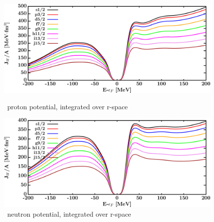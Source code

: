 \begin{figure}[H]
    \centering
    \begin{minipage}{0.45\textwidth}
        \centering
        \includegraphics[width=1.0\textwidth]{figures/ni64_protonVolumeIntegrals.png}
        \caption{\niFour\ proton potential, integrated over r-space}
        \label{DOMFitData_ni64_proton_potentialIntegral}
    \end{minipage}\hfill
    \begin{minipage}{0.45\textwidth}
        \centering
        \includegraphics[width=1.0\textwidth]{figures/ni64_neutronVolumeIntegrals.png}
        \caption{\niFour\ neutron potential, integrated over r-space}
        \label{DOMFitData_ni64_neutron_potentialIntegral}
    \end{minipage}
\end{figure}

\afterpage{\clearpage}

